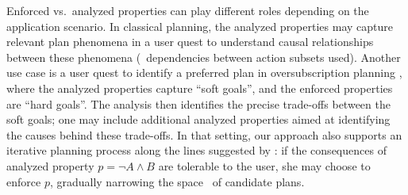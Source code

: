 Enforced vs.\ analyzed properties can play different roles depending
on the application scenario. In classical planning, the analyzed
properties may capture relevant plan phenomena in a user quest to
understand causal relationships between these phenomena
(\eg\ dependencies between action subsets used). Another use case is a
user quest to identify a preferred plan in oversubscription planning
\cite{smith:icaps-04,domshlak:mirkis:jair-15}, where the analyzed
properties capture ``soft goals'', and the enforced properties are
``hard goals''. The analysis then identifies the precise trade-offs
between the soft goals; one may include additional analyzed properties
aimed at identifying the causes behind these trade-offs. In that
setting, our approach also supports an iterative planning process
along the lines suggested by \cite{smith:aaai-12}: if the consequences
of analyzed property $p = \neg A \wedge B$ are tolerable to the user,
she may choose to enforce $p$, gradually narrowing the space
\plans\ of candidate plans.



